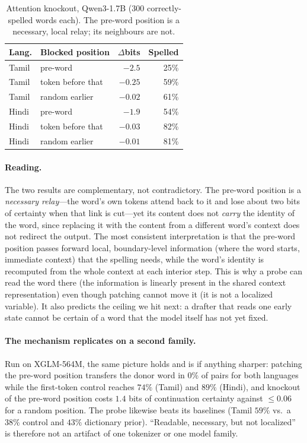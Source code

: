 \documentclass[11pt]{article}
\begin{document}
\begin{table}[t]
\centering\small
\begin{tabular}{llrr}
\toprule
Lang. & Blocked position & $\Delta$bits & Spelled \\
\midrule
Tamil & pre-word & $-2.5$ & 25\% \\
Tamil & token before that & $-0.25$ & 59\% \\
Tamil & random earlier & $-0.02$ & 61\% \\
Hindi & pre-word & $-1.9$ & 54\% \\
Hindi & token before that & $-0.03$ & 82\% \\
Hindi & random earlier & $-0.01$ & 81\% \\
\bottomrule
\end{tabular}
\caption{Attention knockout, Qwen3-1.7B (300 correctly-spelled words each).
The pre-word position is a necessary, local relay; its neighbours are not.}
\label{tab:knockout}
\end{table}

\paragraph{Reading.} The two results are complementary, not contradictory. The
pre-word position is a \emph{necessary relay}---the word's own tokens attend
back to it and lose about two bits of certainty when that link is cut---yet its
content does not \emph{carry} the identity of the word, since replacing it with
the content from a different word's context does not redirect the output. The
most consistent interpretation is that the pre-word position passes forward
local, boundary-level information (where the word starts, immediate context)
that the spelling needs, while the word's identity is recomputed from the whole
context at each interior step. This is why a probe can read the word there (the
information is linearly present in the shared context representation) even
though patching cannot move it (it is not a localized variable). It also
predicts the ceiling we hit next: a drafter that reads one early state cannot
be certain of a word that the model itself has not yet fixed.

\paragraph{The mechanism replicates on a second family.} Run on XGLM-564M, the
same picture holds and is if anything sharper: patching the pre-word position
transfers the donor word in $0\%$ of pairs for both languages while the
first-token control reaches $74\%$ (Tamil) and $89\%$ (Hindi), and knockout of
the pre-word position costs $1.4$ bits of continuation certainty against
$\le 0.06$ for a random position. The probe likewise beats its baselines
(Tamil $59\%$ vs.\ a $38\%$ control and $43\%$ dictionary prior). ``Readable,
necessary, but not localized'' is therefore not an artifact of one tokenizer or
one model family.
\end{document}
